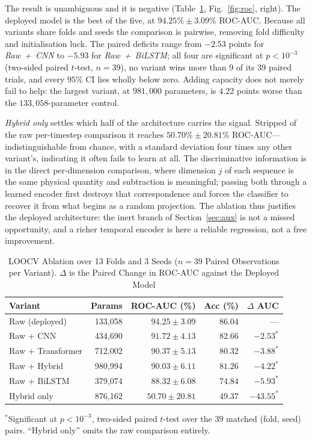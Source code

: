 \documentclass[conference]{IEEEtran}
\newcommand{\tabhead}[1]{\textbf{#1}}
\begin{document}
The result is unambiguous and it is negative (Table~\ref{tab:ablation}, Fig.~\ref{fig:roc}, right). The
deployed model is the best of the five, at
$94.25\% \pm 3.09\%$ ROC-AUC. Because all variants share folds and seeds the
comparison is pairwise, removing fold difficulty and initialisation luck. The
paired deficits range from $-2.53$ points for \emph{Raw~+~CNN} to $-5.93$ for
\emph{Raw~+~BiLSTM}; all four are significant at $p < 10^{-3}$ (two-sided
paired $t$-test, $n = 39$), no variant wins more than 9 of its 39 paired
trials, and every $95\%$ CI lies wholly below zero. Adding capacity does not
merely fail to help: the largest variant, at $981{,}000$ parameters, is $4.22$
points worse than the $133{,}058$-parameter control.

\emph{Hybrid only} settles which half of the architecture carries the signal.
Stripped of the raw per-timestep comparison it reaches $50.70\% \pm 20.81\%$
ROC-AUC---indistinguishable from chance, with a standard deviation four times
any other variant's, indicating it often fails to learn at all. The
discriminative information is in the direct per-dimension comparison, where
dimension $j$ of each sequence is the same physical quantity and subtraction is
meaningful; passing both through a learned encoder first destroys that
correspondence and forces the classifier to recover it from what begins as a
random projection. The ablation thus justifies the deployed architecture: the
inert branch of Section~\ref{sec:aux} is not a missed opportunity, and a richer
temporal encoder is here a reliable regression, not a free improvement.

\begin{table}[!tb]
\caption{LOOCV Ablation over 13 Folds and 3 Seeds ($n = 39$ Paired
Observations per Variant). $\Delta$ is the Paired Change in ROC-AUC against the
Deployed Model}
\label{tab:ablation}
\centering
\footnotesize
\begin{tabular}{@{}lrrrr@{}}
\toprule
\tabhead{Variant} & \tabhead{Params} & \tabhead{ROC-AUC (\%)} &
\tabhead{Acc (\%)} & \tabhead{$\Delta$ AUC} \\
\midrule
Raw (deployed)     & 133{,}058 & $\mathbf{94.25 \pm 3.09}$ & $\mathbf{86.04}$ & --- \\
Raw + CNN          & 434{,}690 & $91.72 \pm 4.13$ & $82.66$ & $-2.53^{\ast}$ \\
Raw + Transformer  & 712{,}002 & $90.37 \pm 5.13$ & $80.32$ & $-3.88^{\ast}$ \\
Raw + Hybrid       & 980{,}994 & $90.03 \pm 6.11$ & $81.26$ & $-4.22^{\ast}$ \\
Raw + BiLSTM       & 379{,}074 & $88.32 \pm 6.08$ & $74.84$ & $-5.93^{\ast}$ \\
Hybrid only        & 876{,}162 & $50.70 \pm 20.81$ & $49.37$ & $-43.55^{\ast}$ \\
\bottomrule
\end{tabular}

\vspace{2pt}
\raggedright\footnotesize
$^{\ast}$Significant at $p < 10^{-3}$, two-sided paired $t$-test over the 39
matched (fold, seed) pairs. ``Hybrid only'' omits the raw comparison entirely.
\end{table}
\end{document}
